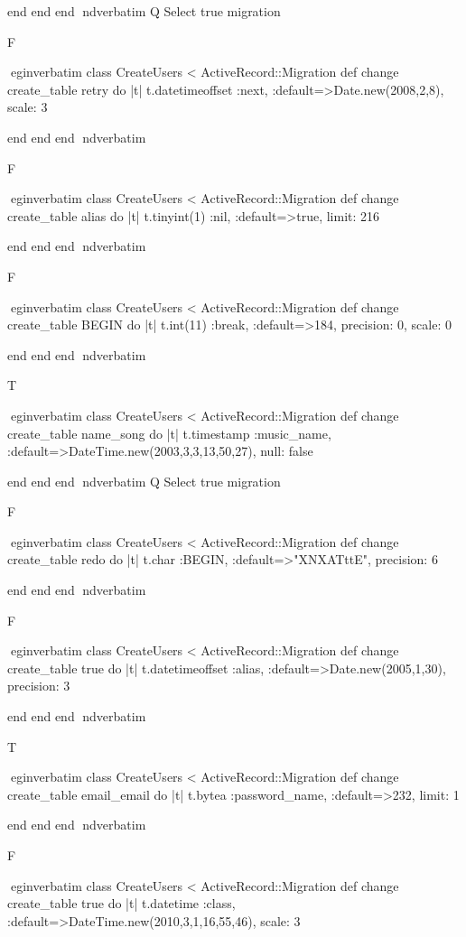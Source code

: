     end 
  end 
end
nd{verbatim}
Q
 Select true migration

F

egin{verbatim}
 class CreateUsers < ActiveRecord::Migration 
  def change 
    create_table retry do |t| 
      t.datetimeoffset :next, :default=>Date.new(2008,2,8), scale: 3
    
    end 
  end 
end
nd{verbatim}

F

egin{verbatim}
 class CreateUsers < ActiveRecord::Migration 
  def change 
    create_table alias do |t| 
      t.tinyint(1) :nil, :default=>true, limit: 216
    
    end 
  end 
end
nd{verbatim}

F

egin{verbatim}
 class CreateUsers < ActiveRecord::Migration 
  def change 
    create_table BEGIN do |t| 
      t.int(11) :break, :default=>184, precision: 0, scale: 0
    
    end 
  end 
end
nd{verbatim}

T

egin{verbatim}
 class CreateUsers < ActiveRecord::Migration 
  def change 
    create_table name_song do |t| 
      t.timestamp :music_name, :default=>DateTime.new(2003,3,3,13,50,27), null: false
    
    end 
  end 
end
nd{verbatim}
Q
 Select true migration

F

egin{verbatim}
 class CreateUsers < ActiveRecord::Migration 
  def change 
    create_table redo do |t| 
      t.char :BEGIN, :default=>"XNXATttE", precision: 6
    
    end 
  end 
end
nd{verbatim}

F

egin{verbatim}
 class CreateUsers < ActiveRecord::Migration 
  def change 
    create_table true do |t| 
      t.datetimeoffset :alias, :default=>Date.new(2005,1,30), precision: 3
    
    end 
  end 
end
nd{verbatim}

T

egin{verbatim}
 class CreateUsers < ActiveRecord::Migration 
  def change 
    create_table email_email do |t| 
      t.bytea :password_name, :default=>232, limit: 1
    
    end 
  end 
end
nd{verbatim}

F

egin{verbatim}
 class CreateUsers < ActiveRecord::Migration 
  def change 
    create_table true do |t| 
      t.datetime :class, :default=>DateTime.new(2010,3,1,16,55,46), scale: 3
    
